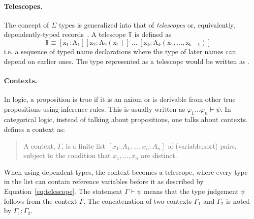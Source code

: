 \paragraph{Telescopes.}
The concept of $\Sigma$ types is generalized into that of \emph{telescopes} or, equivalently, dependently-typed records~\cite{pollack2002dependently}. A telescope $\mathbb{T}$ is defined as 
\begin{equation}
\mathbb{T} \equiv [\text{x}_1 : \text{A}_1]
[\text{x}_2 : \text{A}_2(\text{x}_1)] \ ... \ 
[\text{x}_k : \text{A}_k(\text{x}_1,...,\text{x}_{\text{k}-1})]
\label{eq:telescope}
\end{equation} 
i.e. a sequence of typed name declarations where the type of later names can depend on earlier ones. 
The type \lstmath{Vec A n} represented as a telescope would be written as 
\lstmath{[A : Type][n :$\ \mathbb{N}$][Vec A n]}. 


\paragraph{Contexts.}
In logic, a proposition is true if it is an axiom or is derivable from other true propositions using inference rules. This is usually written as $\varphi_1 ... \varphi_n \vdash \psi$.  In categorical logic, instead of talking about propositions, one talks about contexts. \cite{handbook1993CategoricalLogic} defines a context as: 
\begin{quote}
A context, $\Gamma$, is a finite list $[x_1 : A_1, ... , x_n : A_n]$ of (variable,sort) pairs, subject to the condition that $x_1, ... , x_n$ are distinct.  
\end{quote}
When using dependent types, the context becomes a telescope, where every type in the list can contain reference variables before it as described by Equation~\ref{eq:telescope}. The statement $\Gamma \vdash \psi$ means that the type judgement $\psi$ follows from the context $\Gamma$. The concatenation of two contexts $\Gamma_1$ and $\Gamma_2$ is noted by $\Gamma_1 ; \Gamma_2$.  

